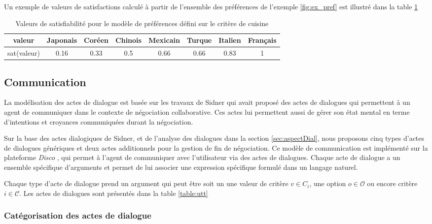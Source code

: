 			Un exemple de valeurs de satisfactions calculé à partir de l'ensemble des préférences de l'exemple \ref{fig:ex_pref} est illustré dans la table \ref{tab:sat}
					\begin{table}[h]
						\centering
								{\scriptsize
						\begin{tabular}{ |c|c|c|c|c|c|c|c| }
							\hline				
							valeur & Japonais & Coréen & Chinois &  Mexicain & Turque & Italien & Français \\
							\hline
							
							sat(valeur) & 0.16 & 0.33 & 0.5 & 0.66 & 0.66 & 0.83 & 1\\
							\hline
							
						\end{tabular}}
						\caption{Valeurs de satisfiabilité pour le modèle de préférences défini sur le critère de cuisine}
						\label{tab:sat}
					\end{table}
	
	\subsection{Communication}
	\label{sec:communication}
	
		
		La modélisation des actes de dialogue est basée sur les travaux de Sidner \cite{sidner1994artificial} qui avait proposé des actes de dialogues qui permettent à un agent de communiquer dans le contexte de négociation collaborative. Ces actes lui permettent aussi de gérer son état mental en terme d'intentions et croyances communiquées durant la négociation. 
		
		Sur la base des actes dialogiques de Sidner, et de l'analyse des dialogues dans la section \ref{sec:aspectDial}, nous proposons cinq types d'actes de dialogues génériques et deux actes additionnels pour la gestion de fin de négociation. 
		Ce modèle de communication est implémenté sur la plateforme \emph{Disco} \cite{rich09}, qui permet à l'agent de communiquer avec l'utilisateur via des actes de dialogues. Chaque acte de dialogue a un ensemble spécifique d'arguments et permet de lui associer une expression spécifique formulé dans un langage naturel.
		
		Chaque type d'acte de dialogue prend un argument qui peut être soit un une valeur de critère  $v \in C_i$, une option $o \in \mathcal{O}$ ou encore critère $i \in \mathcal{C}$. 
		Les actes de dialogues sont présentés dans la table \ref{table:utt}
		
		\subsubsection{Catégorisation des actes de dialogue}
		
